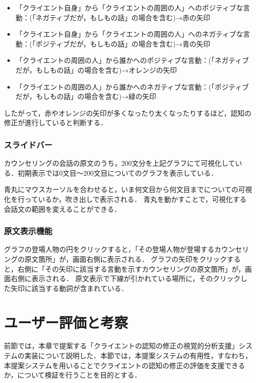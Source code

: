 \documentclass[shuuron]{kuee}
\begin{document}
\begin{itemize}
  \item 「クライエント自身」から「クライエントの周囲の人」へのポジティブな言動：(「ネガティブだが，もしもの話」の場合を含む)→赤の矢印
  \item 「クライエント自身」から「クライエントの周囲の人」へのネガティブな言動：(「ポジティブだが，もしもの話」の場合を含む)→青の矢印
  \item 「クライエントの周囲の人」から誰かへのポジティブな言動：(「ネガティブだが，もしもの話」の場合を含む)→オレンジの矢印
  \item 「クライエントの周囲の人」から誰かへのネガティブな言動：(「ポジティブだが，もしもの話」の場合を含む)→緑の矢印
\end{itemize}

したがって，赤やオレンジの矢印が多くなったり太くなったりするほど，認知の修正が進行していると判断する．

\subsubsection{スライドバー}

カウンセリングの会話の原文のうち，200文分を上記グラフにて可視化している．初期表示では0文目〜200文目についてのグラフを表示している．

青丸にマウスカーソルを合わせると，いま何文目から何文目までについての可視化を行っているか，吹き出しで表示される．
青丸を動かすことで，可視化する会話文の範囲を変えることができる．


\subsubsection{原文表示機能}

グラフの登場人物の円をクリックすると，「その登場人物が登場するカウンセリングの原文箇所」が，画面右側に表示される．
グラフの矢印をクリックすると，右側に「その矢印に該当する言動を示すカウンセリングの原文箇所」が，画面右側に表示される．
原文表示で下線が引かれている場所に，そのクリックした矢印に該当する動詞が含まれている．


\section{ユーザー評価と考察} %

前節では，本章で提案する「クライエントの認知の修正の視覚的分析支援」システムの実装について説明した．本節では，本提案システムの有用性，すなわち，本提案システムを用いることでクライエントの認知の修正の評価を支援できるか，について検証を行うことを目的とする．
\end{document}
